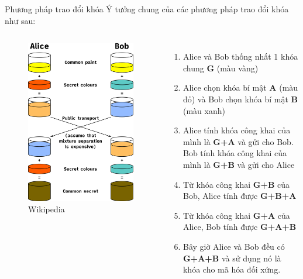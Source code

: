 \begin{frame}{Phương pháp trao đổi khóa}
Ý tưởng chung của các phương pháp trao đổi khóa như sau:
\begin{columns}
\begin{figure}
    \includegraphics[scale=0.1]{diffie-hellman.png}
    \caption{Wikipedia}
\end{figure}

\begin{enumerate}
    \item Alice và Bob thống nhất 1 khóa chung \textbf{G} (màu vàng)
    \item Alice chọn khóa bí mật \textbf{A} (màu đỏ) và Bob chọn khóa bí mật \textbf{B} (màu xanh)
    \item Alice tính khóa công khai của mình là \textbf{G+A} và gửi cho Bob. Bob tính khóa công khai của mình là \textbf{G+B} và gửi cho Alice
    \item Từ khóa công khai \textbf{G+B} của Bob, Alice tính được \textbf{G+B+A}
    \item Từ khóa công khai \textbf{G+A} của Alice, Bob tính được \textbf{G+A+B}
    \item Bây giờ Alice và Bob đều có \textbf{G+A+B} và sử dụng nó là khóa cho mã hóa đối xứng.
\end{enumerate}
\end{columns}
\end{frame}